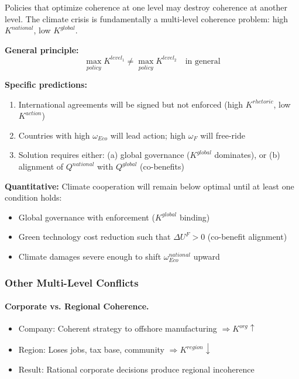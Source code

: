 \begin{tcolorbox}[colback=blue!5!white, colframe=blue!75!black, title=Prediction 7: Multi-Level Coherence Conflict]
Policies that optimize coherence at one level may destroy coherence at 
another level. The climate crisis is fundamentally a multi-level coherence 
problem: high $K^{national}$, low $K^{global}$.

\textbf{General principle:}
\begin{equation}
\max_{policy} K^{level_1} \neq \max_{policy} K^{level_2} \quad \text{in general}
\end{equation}

\textbf{Specific predictions:}
\begin{enumerate}
  \item International agreements will be signed but not enforced (high $K^{rhetoric}$, low $K^{action}$)
  \item Countries with high $\omega_{Eco}$ will lead action; high $\omega_F$ will free-ride
  \item Solution requires either: (a) global governance ($K^{global}$ dominates), or (b) alignment of $Q^{national}$ with $Q^{global}$ (co-benefits)
\end{enumerate}

\textbf{Quantitative:} Climate cooperation will remain below optimal until 
at least one condition holds:
\begin{itemize}
  \item Global governance with enforcement ($K^{global}$ binding)
  \item Green technology cost reduction such that $\Delta U^F > 0$ (co-benefit alignment)
  \item Climate damages severe enough to shift $\omega_{Eco}^{national}$ upward
\end{itemize}
\end{tcolorbox}

\subsubsection{Other Multi-Level Conflicts}

\paragraph{Corporate vs. Regional Coherence.}
\begin{itemize}
  \item Company: Coherent strategy to offshore manufacturing $\Rightarrow K^{org} \uparrow$
  \item Region: Loses jobs, tax base, community $\Rightarrow K^{region} \downarrow$
  \item Result: Rational corporate decisions produce regional incoherence
\end{itemize}

